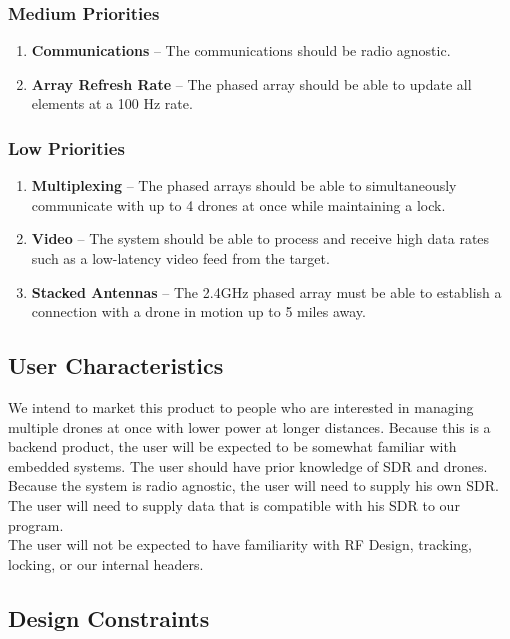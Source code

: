 \documentclass[ProductRequirements.tex]{subfiles}
\begin{document}
		\subsubsection{Medium Priorities}
			\begin{enumerate}
				\item \textbf{Communications} -- The communications should be radio agnostic.
				\item \textbf{Array Refresh Rate} -- The phased array should be able to update all elements at a 100 Hz rate.
			\end{enumerate}
		
		\subsubsection{Low Priorities}
			\begin{enumerate}
				\item \textbf{Multiplexing} -- The phased arrays should be able to simultaneously communicate with up to 4 drones at once while maintaining a lock.
				\item \textbf{Video} -- The system should be able to process and receive high data rates such as a low-latency video feed from the target.
				\item \textbf{Stacked Antennas} -- The 2.4GHz phased array must be able to establish a connection with a drone in motion up to 5 miles away.
			\end{enumerate}
		
	\subsection{User Characteristics}
		We intend to market this product to people who are interested in managing multiple drones at once with lower power at longer distances. Because this is a backend product, the user will be expected to be somewhat familiar with embedded systems. The user should have prior knowledge of SDR and drones. Because the system is radio agnostic, the user will need to supply his own SDR. The user will need to supply data that is compatible with his SDR to our program.\\
		
		The user will not be expected to have familiarity with RF Design, tracking, locking, or our internal headers.
		
	\subsection{Design Constraints}
\end{document}
